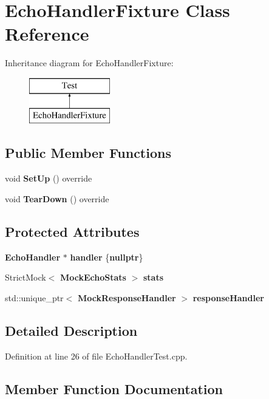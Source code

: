\section{Echo\+Handler\+Fixture Class Reference}
\label{classEchoHandlerFixture}
Inheritance diagram for Echo\+Handler\+Fixture\+:\begin{figure}[H]
\begin{center}
\leavevmode
\includegraphics[height=2.000000cm]{classEchoHandlerFixture}
\end{center}
\end{figure}
\subsection*{Public Member Functions}
\begin{DoxyCompactItemize}
\item 
void {\bf Set\+Up} () override
\item 
void {\bf Tear\+Down} () override
\end{DoxyCompactItemize}
\subsection*{Protected Attributes}
\begin{DoxyCompactItemize}
\item 
{\bf Echo\+Handler} $\ast$ {\bf handler} \{{\bf nullptr}\}
\item 
Strict\+Mock$<$ {\bf Mock\+Echo\+Stats} $>$ {\bf stats}
\item 
std\+::unique\+\_\+ptr$<$ {\bf Mock\+Response\+Handler} $>$ {\bf response\+Handler}
\end{DoxyCompactItemize}


\subsection{Detailed Description}


Definition at line 26 of file Echo\+Handler\+Test.\+cpp.



\subsection{Member Function Documentation}
